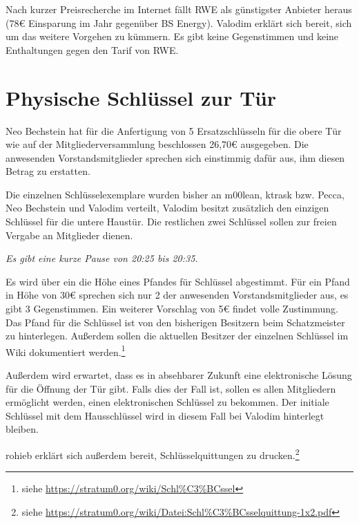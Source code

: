 \documentclass[a4paper,12pt]{scrartcl}
\begin{document}
Nach kurzer Preisrecherche im Internet fällt RWE als günstigster Anbieter
heraus (78€ Einsparung im Jahr gegenüber BS Energy). Valodim erklärt sich
bereit, sich um das weitere Vorgehen zu kümmern. Es gibt keine Gegenstimmen und
keine Enthaltungen gegen den Tarif von RWE.

\section{Physische Schlüssel zur Tür}
Neo Bechstein hat für die Anfertigung von 5 Ersatzschlüsseln für die obere Tür
wie auf der Mitgliederversammlung beschlossen 26{,}70€ ausgegeben. Die
anwesenden Vorstandsmitglieder sprechen sich einstimmig dafür aus, ihm diesen
Betrag zu erstatten.

Die einzelnen Schlüsselexemplare wurden bisher an m00lean, ktrask bzw. Pecca,
Neo Bechstein und Valodim verteilt, Valodim besitzt zusätzlich den einzigen
Schlüssel für die untere Haustür. Die restlichen zwei Schlüssel sollen zur
freien Vergabe an Mitglieder dienen.

\emph{Es gibt eine kurze Pause von 20:25 bis 20:35.}

Es wird über ein die Höhe eines Pfandes für Schlüssel abgestimmt. Für ein Pfand
in Höhe von 30€ sprechen sich nur 2 der anwesenden Vorstandsmitglieder aus, es
gibt 3 Gegenstimmen. Ein weiterer Vorschlag von 5€ findet volle Zustimmung. Das
Pfand für die Schlüssel ist von den bisherigen Besitzern beim Schatzmeister zu
hinterlegen. Außerdem sollen die aktuellen Besitzer der einzelnen Schlüssel
im Wiki dokumentiert werden.\footnote{siehe
\url{https://stratum0.org/wiki/Schl\%C3\%BCssel}}

Außerdem wird erwartet, dass es in absehbarer Zukunft eine elektronische Lösung
für die Öffnung der Tür gibt. Falls dies der Fall ist, sollen es allen
Mitgliedern ermöglicht werden, einen elektronischen Schlüssel zu bekommen. Der
initiale Schlüssel mit dem Hausschlüssel wird in diesem Fall bei Valodim
hinterlegt bleiben.

rohieb erklärt sich außerdem bereit, Schlüsselquittungen zu drucken.\footnote{%
siehe \url{https://stratum0.org/wiki/Datei:Schl\%C3\%BCsselquittung-1x2.pdf}}

\end{document}
